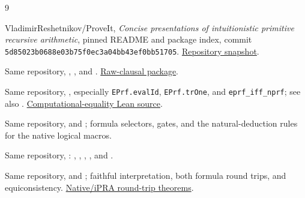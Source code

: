\documentclass[11pt,letterpaper]{article}
\theoremstyle{definition}\newtheorem{definition}[theorem]{Definition}
\begin{document}
\begin{thebibliography}{9}\raggedright
{}
VladimirReshetnikov/ProveIt, \emph{Concise presentations of intuitionistic
primitive recursive arithmetic}, pinned README and package index,
commit \texttt{5d85023b0688e03b75f0ec3a04bb43ef0bb51705}.
\href{https://github.com/VladimirReshetnikov/ProveIt/tree/5d85023b0688e03b75f0ec3a04bb43ef0bb51705/Logic/PrimitiveRecursiveArithmetic/ConciseIPRA}{Repository snapshot}.

Same repository, ,
, and
.
\href{https://github.com/VladimirReshetnikov/ProveIt/tree/5d85023b0688e03b75f0ec3a04bb43ef0bb51705/Logic/PrimitiveRecursiveArithmetic/ConciseIPRA/Research/raw_clausal}{Raw-clausal package}.

Same repository, , especially
\texttt{EPrf.evalId}, \texttt{EPrf.trOne}, and
\texttt{eprf\_iff\_nprf}; see also
.
\href{https://github.com/VladimirReshetnikov/ProveIt/blob/5d85023b0688e03b75f0ec3a04bb43ef0bb51705/Logic/PrimitiveRecursiveArithmetic/ConciseIPRA/Lean/ConciseIPRA/NativeEval.lean}{Computational-equality Lean source}.

Same repository,  and
; formula selectors, gates, and
the natural-deduction rules for the native logical macros.

Same repository, :
, ,
, , and
.

Same repository,  and
; faithful interpretation,
both formula round trips, and equiconsistency.
\href{https://github.com/VladimirReshetnikov/ProveIt/blob/5d85023b0688e03b75f0ec3a04bb43ef0bb51705/Logic/PrimitiveRecursiveArithmetic/ConciseIPRA/Lean/ConciseIPRA/NativeBiInterpretation.lean}{Native/iPRA round-trip theorems}.
\end{thebibliography}
\end{document}
